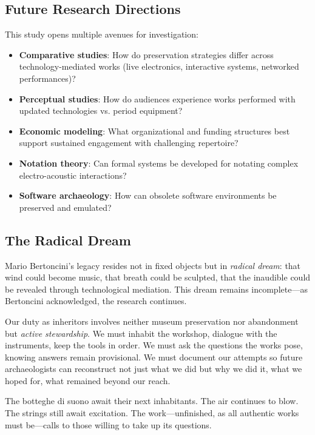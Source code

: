 \subsection{Future Research Directions}

This study opens multiple avenues for investigation:

\begin{itemize}
  \item \textbf{Comparative studies}: How do preservation strategies differ 
  across technology-mediated works (live electronics, interactive systems, 
  networked performances)?
  \item \textbf{Perceptual studies}: How do audiences experience works 
  performed with updated technologies vs. period equipment?
  \item \textbf{Economic modeling}: What organizational and funding structures 
  best support sustained engagement with challenging repertoire?
  \item \textbf{Notation theory}: Can formal systems be developed for notating 
  complex electro-acoustic interactions?
  \item \textbf{Software archaeology}: How can obsolete software environments 
  be preserved and emulated?
\end{itemize}

\subsection{The Radical Dream}

Mario Bertoncini's legacy resides not in fixed objects but in \emph{radical 
dream}: that wind could become music, that breath could be sculpted, that the 
inaudible could be revealed through technological mediation. This dream remains 
incomplete---as Bertoncini acknowledged, the research continues.

Our duty as inheritors involves neither museum preservation nor abandonment 
but \emph{active stewardship}. We must inhabit the workshop, dialogue with the 
instruments, keep the tools in order. We must ask the questions the works pose, 
knowing answers remain provisional. We must document our attempts so future 
archaeologists can reconstruct not just what we did but why we did it, what we 
hoped for, what remained beyond our reach.

The botteghe di suono await their next inhabitants. The air continues to blow. 
The strings still await excitation. The work---unfinished, as all authentic 
works must be---calls to those willing to take up its questions.

